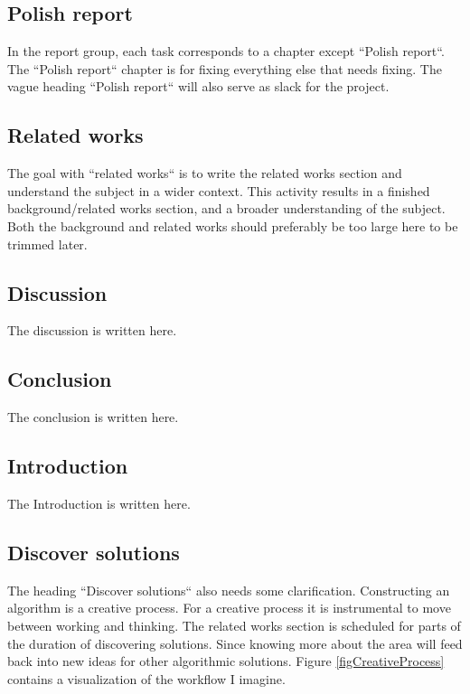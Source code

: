 \documentclass[msc,lith,english]{liuthesis}
\begin{document}
\subsection{Polish report}
In the report group, each task corresponds to a chapter except ``Polish report``.
The ``Polish report`` chapter is for fixing everything else that needs fixing.
The vague heading ``Polish report`` will also serve as slack for the project.

\subsection{Related works}
The goal with ``related works`` is to write the related works section and understand the subject in a wider context.
This activity results in a finished background/related works section, and a broader understanding of the subject.
Both the background and related works should preferably be too large here to be trimmed later.

\subsection{Discussion}
The discussion is written here.

\subsection{Conclusion}
The conclusion is written here.

\subsection{Introduction}
The Introduction is written here.

\subsection{Discover solutions}
The heading ``Discover solutions`` also needs some clarification. Constructing
an algorithm is a creative process. For a creative process it is instrumental
to move between working and thinking. The related works section is scheduled for
parts of the duration of discovering solutions. Since knowing more about the
area will feed back into new ideas for other algorithmic solutions. 
Figure \ref{figCreativeProcess} contains a visualization of the workflow I imagine.
\end{document}

